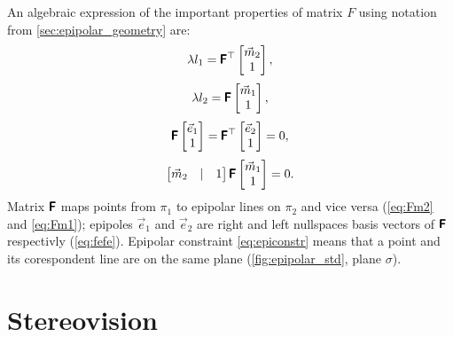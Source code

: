An algebraic expression of the important properties of matrix $F$ using notation from \autoref{sec:epipolar_geometry} are:
\begin{equation}
    \label{eq:Fm2}
    \lambda l_1 = \pmb{\mathsf{F}}^\top \begin{bmatrix} \vec{m}_2 \\ 1 \end{bmatrix},
\end{equation}
\begin{equation}
    \label{eq:Fm1}
    \lambda l_2 = \pmb{\mathsf{F}} \begin{bmatrix} \vec{m}_1 \\ 1 \end{bmatrix},
\end{equation}
\begin{equation}
    \label{eq:fefe}
    \pmb{\mathsf{F}} \begin{bmatrix} \vec{e}_1 \\ 1 \end{bmatrix} = \pmb{\mathsf{F}}^\top \begin{bmatrix} \vec{e}_2 \\ 1 \end{bmatrix} = 0,
\end{equation}
\begin{equation}
    \label{eq:epiconstr}
    \begin{bmatrix} \vec{m}_2 & | & 1 \end{bmatrix} \pmb{\mathsf{F}} \begin{bmatrix} \vec{m}_1 \\ 1 \end{bmatrix} = 0.
\end{equation}
Matrix $\pmb{\mathsf{F}}$ maps points from $\pi_1$ to epipolar lines on $\pi_2$ and vice versa (\eqref{eq:Fm2} and \eqref{eq:Fm1}); epipoles $\vec{e}_1$ and $\vec{e}_2$ are right and left nullspaces basis vectors of $\pmb{\mathsf{F}}$ respectivly (\eqref{eq:fefe}).
Epipolar constraint \eqref{eq:epiconstr} means that a point and its corespondent line are on the same plane (\eqref{fig:epipolar_std}, plane $\sigma$).

\section{Stereovision}

